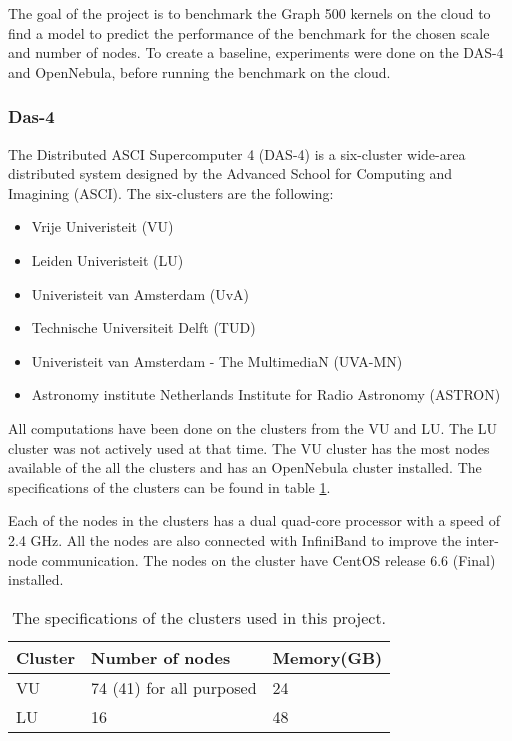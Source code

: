 The goal of the project is to benchmark the Graph 500 kernels on the cloud to find a model to predict the performance of the benchmark for the chosen scale and number of nodes. To create a baseline, experiments were done on the DAS-4 and OpenNebula, before running the benchmark on the cloud.
\subsubsection{Das-4}
\label{hw:das4}
The Distributed ASCI Supercomputer 4 (DAS-4) is a six-cluster wide-area distributed system designed by the Advanced School for Computing and Imagining (ASCI)\cite{das-4}. The six-clusters are the following:
\begin{itemize}
\item Vrije Univeristeit (VU)
\item Leiden Univeristeit (LU)
\item Univeristeit van Amsterdam (UvA) 
\item Technische Universiteit Delft (TUD)
\item Univeristeit van Amsterdam - The MultimediaN (UVA-MN) 
\item Astronomy institute Netherlands Institute for Radio Astronomy (ASTRON)
\end{itemize}
All computations have been done on the clusters from the VU and LU. The LU cluster was not actively used at that time. The VU cluster has the most nodes available of the all the clusters and has an OpenNebula cluster installed. The specifications of the clusters can be found in table \ref{tab:das-clusters}. 

Each of the nodes in the clusters has a dual quad-core processor with a speed of 2.4 GHz. All the nodes are also connected with InfiniBand\cite{infiniband} to improve the inter-node communication. The nodes on the cluster have CentOS release 6.6 (Final) installed.
\begin{table}[!h]
	\begin{center}
\begin{tabular}{|l|l|l|}
\hline
Cluster & Number of nodes  & Memory(GB) \\ \hline
VU 		& 74 (41) for all purposed	 & 24			\\ \hline
LU		& 16 & 48 \\ \hline
\end{tabular}
\end{center}
\caption{The specifications of the clusters used in this project.}
\label{tab:das-clusters}
\end{table}

